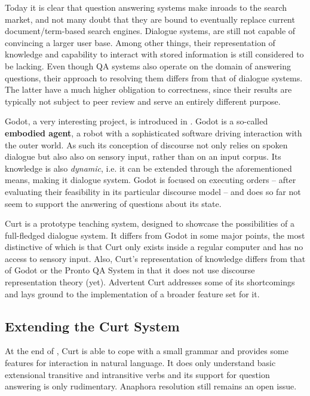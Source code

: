 \documentclass[a4paper]{article}
\newcommand{\abbr}{\textsf} %
\newcommand{\term}[1]{\textsf{\textbf{#1}}} %
\newcommand{\pn}{\textsf} %
\newcommand{\curt}{\pn{Curt}}
\newcommand{\acurt}{\pn{Advertent Curt}}
\theoremstyle{remark}
\theoremstyle{remark}
\theoremstyle{definition}
\theoremstyle{definition}
\begin{document}
Today it is clear that question answering systems make inroads to the search
market, and not many doubt that they are bound to eventually replace current
document/term-based search engines. Dialogue systems, are still not capable of
convincing a larger user base. Among other things, their representation of
knowledge and capability to interact with stored information is still considered
to be lacking.  Even though \abbr{QA} systems also operate on the domain of
answering questions, their approach to resolving them differs from that of
dialogue systems. The latter have a much higher obligation to correctness, since
their results are typically not subject to peer review and serve an entirely
different purpose.

\pn{Godot}, a very interesting project, is introduced in \cite{godot}.
\pn{Godot} is a so-called \term{embodied agent}, a robot with a sophisticated
software driving interaction with the outer world. As such its conception of
discourse not only relies on spoken dialogue but also also on sensory input, rather
than on an input corpus. Its knowledge is also \emph{dynamic}, i.e. it can be
extended through the aforementioned means, making it
dialogue system.
\pn{Godot} is focused on executing orders -- after evaluating their feasibility
in its particular discourse model -- and does so far not seem to support the answering
of questions about its state.

\curt{} is a prototype teaching system, designed to showcase the possibilities
of a full-fledged dialogue system. It differs from \pn{Godot} in some major
points, the most distinctive of which is that \curt{} only exists inside a
regular computer and has no access to sensory input. Also, \curt's
representation of knowledge differs from that of \pn{Godot} or the \pn{Pronto QA
System} in that it does not use discourse representation theory (yet). \acurt{}
addresses some of its shortcomings and lays ground to the implementation of a
broader feature set for it.

\subsection{Extending the Curt System}\label{sec:extension}

At the end of \cite{blackburnbos:cl1}, \curt{} is able to cope with a small
grammar and provides some features for interaction in natural
language. It does only understand basic extensional transitive and intransitive
verbs and its support for question answering is only rudimentary.
Anaphora resolution still remains an open issue.
\end{document}

